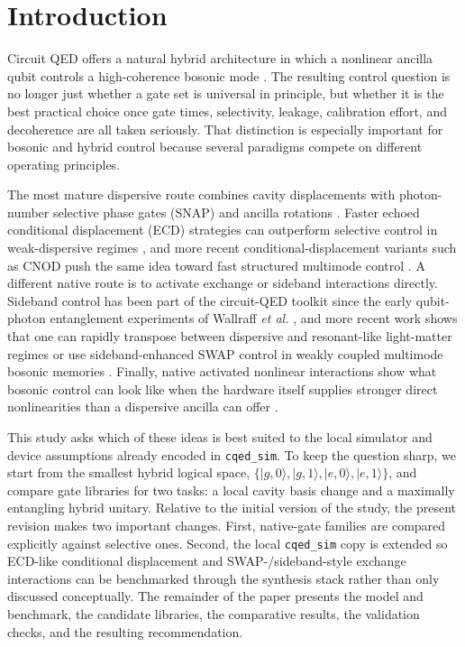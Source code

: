 \documentclass[11pt, a4paper]{article}
\begin{document}
\section{Introduction}
Circuit QED offers a natural hybrid architecture in which a nonlinear ancilla
qubit controls a high-coherence bosonic mode \cite{blais2004cqed,koch2007transmon}.
The resulting control question is no longer just whether a gate set is
universal in principle, but whether it is the best practical choice once gate
times, selectivity, leakage, calibration effort, and decoherence are all taken
seriously. That distinction is especially important for bosonic and hybrid
control because several paradigms compete on different operating principles.

The most mature dispersive route combines cavity displacements with
photon-number selective phase gates (SNAP) and ancilla rotations
\cite{heeres2015snap,krastanov2015universal,heeres2017logical}. Faster echoed
conditional displacement (ECD) strategies can outperform selective control in
weak-dispersive regimes \cite{eickbusch2022ecd}, and more recent
conditional-displacement variants such as CNOD push the same idea toward fast
structured multimode control \cite{diringer2024cnod}. A different native route
is to activate exchange or sideband interactions directly. Sideband control has
been part of the circuit-QED toolkit since the early qubit-photon entanglement
experiments of Wallraff \textit{et al.} \cite{wallraff2007sideband}, and more
recent work shows that one can rapidly transpose between dispersive and
resonant-like light-matter regimes \cite{valadares2024transposition} or use
sideband-enhanced SWAP control in weakly coupled multimode bosonic memories
\cite{huang2025fastsideband}. Finally, native activated nonlinear interactions
show what bosonic control can look like when the hardware itself supplies
stronger direct nonlinearities than a dispersive ancilla can offer
\cite{yang2024nativecubic}.

This study asks which of these ideas is best suited to the local simulator and
device assumptions already encoded in \texttt{cqed\_sim}. To keep the question
sharp, we start from the smallest hybrid logical space,
\(\{|g,0\rangle, |g,1\rangle, |e,0\rangle, |e,1\rangle\}\), and compare gate
libraries for two tasks: a local cavity basis change and a maximally entangling
hybrid unitary. Relative to the initial version of the study, the present
revision makes two important changes. First, native-gate families are compared
explicitly against selective ones. Second, the local \texttt{cqed\_sim} copy is
extended so ECD-like conditional displacement and SWAP-/sideband-style exchange
interactions can be benchmarked through the synthesis stack rather than only
discussed conceptually. The remainder of the paper presents the model and
benchmark, the candidate libraries, the comparative results, the validation
checks, and the resulting recommendation.
\end{document}
